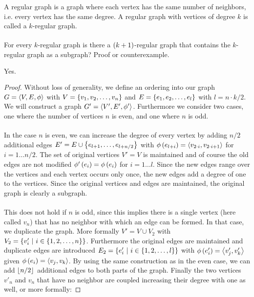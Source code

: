 \documentclass{article}
\begin{document}
\begin{exercise}
A regular graph is a graph where each vertex has the same number of neighbors, i.e. every vertex has the same degree. A regular graph with vertices of degree $k$ is called a $k$-regular graph.
\paragraph{}
For every $k$-regular graph is there a $\left( k+1 \right)$-regular graph that contains the $k$-regular graph as a subgraph? Proof or counterexample.
\begin{answer}
Yes.
\begin{proof}
Without loss of generality, we define an ordering into our graph $G=\left\langle V,E,\phi \right\rangle$ with $V=\left\{ v_1,v_2,\ldots,v_n \right\}$ and $E=\left\{ e_1,e_2,\ldots,e_l \right\}$ with $l=n\cdot k/2$. We will construct a graph $G'=\left\langle V',E',\phi' \right\rangle$. Furthermore we consider two cases, one where the number of vertices $n$ is even, and one where $n$ is odd.
\paragraph{}In the case $n$ is even, we can increase the degree of every vertex by adding $n/2$ additional edges $E'=E\cup\left\{ e_{l+1},\ldots,e_{l+n/2} \right\}$ with $\phi\left( e_{l+i} \right)=\left\langle v_{2\cdot i},v_{2\cdot i+1} \right\rangle$ for $i=1\ldots n/2$. The set of original vertices $V'=V$ is maintained and of course the old edges are not modified $\phi'\left( e_i \right)=\phi\left( e_i \right)$ for $i=1\ldots l$. Since the new edges range over the vertices and each vertex occurs only once, the new edges add a degree of one to the vertices. Since the original vertices and edges are maintained, the original graph is clearly a subgraph.
\paragraph{}This does not hold if $n$ is odd, since this implies there is a single vertex (here called $v_n$) that has no neighbor with which an edge can be formed. In that case, we duplicate the graph. More formally $V'=V\cup V_2$ with $V_2=\left\{ v'_i\ |\ i\in\left\{ 1,2,\ldots,n \right\} \right\}$. Furthermore the original edges are maintained and duplicate edges are introduced $E_2=\left\{ e'_i\ |\ i\in\left\{ 1,2,\ldots,l \right\} \right\}$ with $\phi\left( e'_i \right)=\left\langle v'_j,v'_k \right\rangle$ given $\phi\left( e_i \right)=\left\langle v_j,v_k \right\rangle$. By using the same construction as in the even case, we can add $\left\lfloor n/2 \right\rfloor$ additional edges to both parts of the graph. Finally the two vertices $v'_n$ and $v_n$ that have no neighbor are coupled increasing their degree with one as well, or more formally:
\end{proof}
\end{answer}
\end{exercise}
\end{document}
